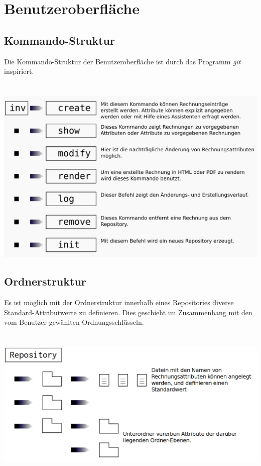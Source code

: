 
\section{Benutzeroberfläche}

\subsection{Kommando-Struktur}
Die Kommando-Struktur der Benutzeroberfläche ist durch das Programm \emph{git} inspiriert.\\
\\\\
\includegraphics[width=\textwidth]{kommando-struktur.png}
\\
\subsection{Ordnerstruktur}
Es ist möglich mit der Ordnerstruktur innerhalb eines Repositories diverse
Standard-Attributwerte zu definieren. Dies geschieht im Zusammenhang mit den vom
Benutzer gewählten Ordnungsschlüsseln.\\
\\\\
\includegraphics[width=\textwidth]{ordnerstruktur-struktur.png}
\\\\
